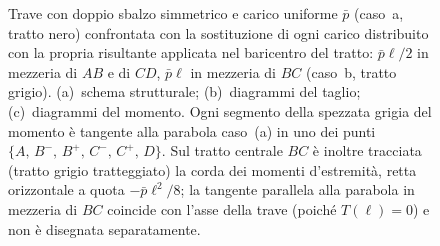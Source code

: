 \begin{figure}[htbp]
{
			}
			\caption{Trave con doppio sbalzo simmetrico e carico uniforme $\bar p$
				(caso~a, tratto nero) confrontata con la sostituzione di ogni
				carico distribuito con la propria risultante applicata nel
				baricentro del tratto: $\bar p\ell/2$ in mezzeria di $AB$ e di
				$CD$, $\bar p\ell$ in mezzeria di $BC$ (caso~b, tratto grigio).
				(a)~schema strutturale; (b)~diagrammi del taglio; (c)~diagrammi
				del momento. Ogni segmento della spezzata grigia del momento è
				tangente alla parabola caso~(a) in uno dei punti
				$\{A,\,B^-,\,B^+,\,C^-,\,C^+,\,D\}$. Sul tratto centrale $BC$
				è inoltre tracciata (tratto grigio tratteggiato) la corda dei
				momenti d'estremità, retta orizzontale a quota $-\bar p\ell^2/8$;
				la tangente parallela alla parabola in mezzeria di $BC$ coincide
				con l'asse della trave (poiché $T(\ell) = 0$) e non è disegnata
				separatamente.}
			\label{fig:stat_sbalzo_02}
		\end{figure}
